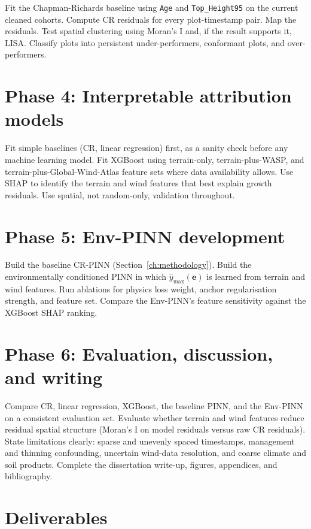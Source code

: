 Fit the Chapman-Richards baseline using \texttt{Age} and \texttt{Top\_Height95} on the current cleaned cohorts. Compute CR residuals for every plot-timestamp pair. Map the residuals. Test spatial clustering using Moran's I and, if the result supports it, LISA. Classify plots into persistent under-performers, conformant plots, and over-performers.

\section{Phase 4: Interpretable attribution models}

Fit simple baselines (CR, linear regression) first, as a sanity check before any machine learning model. Fit XGBoost using terrain-only, terrain-plus-WASP, and terrain-plus-Global-Wind-Atlas feature sets where data availability allows. Use SHAP to identify the terrain and wind features that best explain growth residuals. Use spatial, not random-only, validation throughout.

\section{Phase 5: Env-PINN development}

Build the baseline CR-PINN (Section~\ref{ch:methodology}). Build the environmentally conditioned PINN in which $\hat{y}_{\max}(\mathbf{e})$ is learned from terrain and wind features. Run ablations for physics loss weight, anchor regularisation strength, and feature set. Compare the Env-PINN's feature sensitivity against the XGBoost SHAP ranking.

\section{Phase 6: Evaluation, discussion, and writing}

Compare CR, linear regression, XGBoost, the baseline PINN, and the Env-PINN on a consistent evaluation set. Evaluate whether terrain and wind features reduce residual spatial structure (Moran's I on model residuals versus raw CR residuals). State limitations clearly: sparse and unevenly spaced timestamps, management and thinning confounding, uncertain wind-data resolution, and coarse climate and soil products. Complete the dissertation write-up, figures, appendices, and bibliography.

\section{Deliverables}

